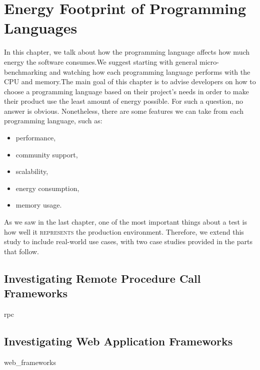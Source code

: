 \chapter{Energy Footprint of Programming Languages}
\label{chapter:porgramming_langauges}
In this chapter, we talk about how the programming language affects how much energy the software consumes.We suggest starting with general micro-benchmarking and watching how each programming language performs with the CPU and memory.The main goal of this chapter is to advise developers on how to choose a programming language based on their project's needs in order to make their product use the least amount of energy possible. For such a question, no answer is obvious.
Nonetheless, there are some features we can take from each programming language, such as: 
\begin{itemize}
    \item performance,
    \item community support,
    \item scalability,
    \item energy consumption,
    \item memory usage.
\end{itemize}

As we saw in the last chapter, one of the most important things about a test is how well it \textsc{represents} the production environment.
Therefore, we extend this study to include real-world use cases, with two case studies provided in the parts that follow. 

\section{Investigating Remote Procedure Call Frameworks}
{rpc}

\section{Investigating Web Application Frameworks}
{web_frameworks}